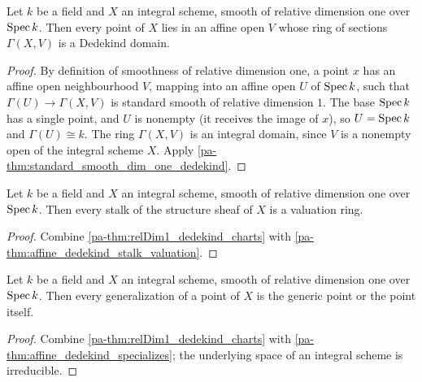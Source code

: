 \begin{theorem}
  \label{pa-thm:relDim1_dedekind_charts}
  \leanok

  Let \(k\) be a field and \(X\) an integral scheme, smooth of relative dimension one over
  \(\operatorname{Spec} k\). Then every point of \(X\) lies in an affine open \(V\) whose ring of
  sections \(\Gamma(X, V)\) is a Dedekind domain.
\end{theorem}
\begin{proof}
  \leanok
  By definition of smoothness of relative dimension one, a point \(x\) has an affine open
  neighbourhood \(V\), mapping into an affine open \(U\) of \(\operatorname{Spec} k\), such that
  \(\Gamma(U) \to \Gamma(X, V)\) is standard smooth of relative dimension \(1\). The base
  \(\operatorname{Spec} k\) has a single point, and \(U\) is nonempty (it receives the image of \(x\)),
  so \(U = \operatorname{Spec} k\) and \(\Gamma(U) \cong k\). The ring \(\Gamma(X, V)\) is an integral
  domain, since \(V\) is a nonempty open of the integral scheme \(X\). Apply
  \ref{pa-thm:standard_smooth_dim_one_dedekind}.
\end{proof}

\begin{theorem}
  \label{pa-thm:relDim1_stalks_valuation}
  \leanok

  Let \(k\) be a field and \(X\) an integral scheme, smooth of relative dimension one over
  \(\operatorname{Spec} k\). Then every stalk of the structure sheaf of \(X\) is a valuation ring.
\end{theorem}
\begin{proof}
  \leanok
  Combine \ref{pa-thm:relDim1_dedekind_charts} with
  \ref{pa-thm:affine_dedekind_stalk_valuation}.
\end{proof}

\begin{theorem}
  \label{pa-thm:relDim1_specializes}
  \leanok

  Let \(k\) be a field and \(X\) an integral scheme, smooth of relative dimension one over
  \(\operatorname{Spec} k\). Then every generalization of a point of \(X\) is the generic point or the
  point itself.
\end{theorem}
\begin{proof}
  \leanok
  Combine \ref{pa-thm:relDim1_dedekind_charts} with \ref{pa-thm:affine_dedekind_specializes};
  the underlying space of an integral scheme is irreducible.
\end{proof}

